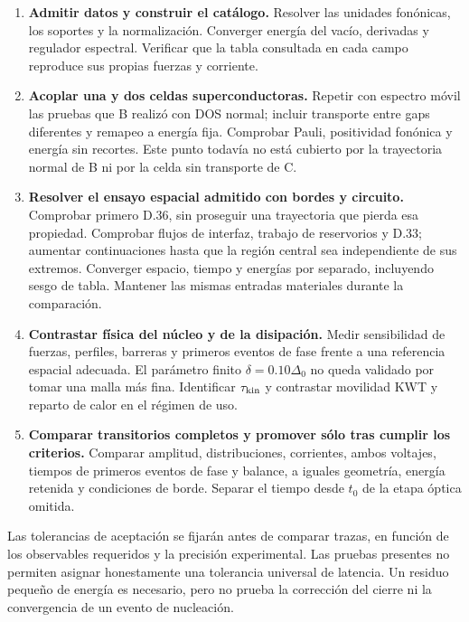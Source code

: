 \documentclass[
  spanish,
  10pt,
  a4paper,
]{article}
\providecommand{\tightlist}{%
  \setlength{\itemsep}{0pt}\setlength{\parskip}{0pt}}
\begin{document}
\begin{enumerate}
\def\labelenumi{\arabic{enumi}.}
\tightlist
\item
  \textbf{Admitir datos y construir el catálogo.} Resolver las unidades
  fonónicas, los soportes y la normalización. Converger energía del
  vacío, derivadas y regulador espectral. Verificar que la tabla
  consultada en cada campo reproduce sus propias fuerzas y corriente.
\item
  \textbf{Acoplar una y dos celdas superconductoras.} Repetir con
  espectro móvil las pruebas que B realizó con DOS normal; incluir
  transporte entre gaps diferentes y remapeo a energía fija. Comprobar
  Pauli, positividad fonónica y energía sin recortes. Este punto todavía
  no está cubierto por la trayectoria normal de B ni por la celda sin
  transporte de C.
\item
  \textbf{Resolver el ensayo espacial admitido con bordes y circuito.}
  Comprobar primero D.36, sin proseguir una trayectoria que pierda esa
  propiedad. Comprobar flujos de interfaz, trabajo de reservorios y
  D.33; aumentar continuaciones hasta que la región central sea
  independiente de sus extremos. Converger espacio, tiempo y energías
  por separado, incluyendo sesgo de tabla. Mantener las mismas entradas
  materiales durante la comparación.
\item
  \textbf{Contrastar física del núcleo y de la disipación.} Medir
  sensibilidad de fuerzas, perfiles, barreras y primeros eventos de fase
  frente a una referencia espacial adecuada. El parámetro finito
  \(\delta=0.10\Delta_0\) no queda validado por tomar una malla más
  fina. Identificar \(\tau_{\rm kin}\) y contrastar movilidad KWT y
  reparto de calor en el régimen de uso.
\item
  \textbf{Comparar transitorios completos y promover sólo tras cumplir
  los criterios.} Comparar amplitud, distribuciones, corrientes, ambos
  voltajes, tiempos de primeros eventos de fase y balance, a iguales
  geometría, energía retenida y condiciones de borde. Separar el tiempo
  desde \(t_0\) de la etapa óptica omitida.
\end{enumerate}

Las tolerancias de aceptación se fijarán antes de comparar trazas, en
función de los observables requeridos y la precisión experimental. Las
pruebas presentes no permiten asignar honestamente una tolerancia
universal de latencia. Un residuo pequeño de energía es necesario, pero
no prueba la corrección del cierre ni la convergencia de un evento de
nucleación.
\end{document}
